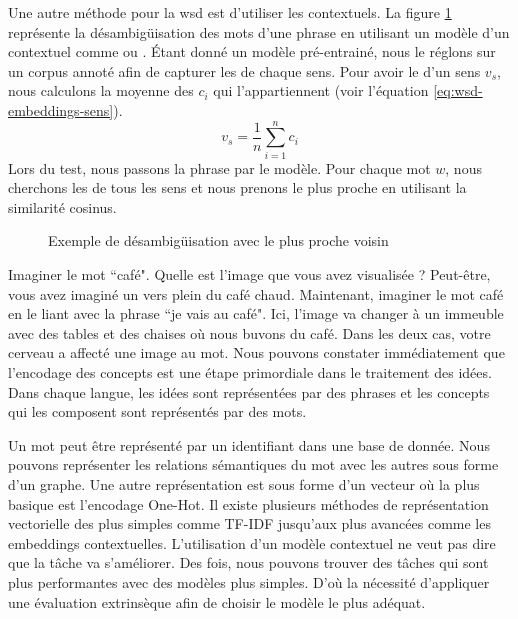\documentclass{KodeBook}
\begin{document}
Une autre méthode pour la \ac{wsd}  est d'utiliser les  contextuels. 
La figure \ref{fig:swd-embeddings} représente la désambigüisation des mots d'une phrase en utilisant un modèle d'un  contextuel comme  ou . 
Étant donné un modèle pré-entrainé, nous le réglons sur un corpus annoté afin de capturer les  de chaque sens. 
Pour avoir le  d'un sens $v_s$, nous calculons la moyenne des  $c_i$ qui l'appartiennent (voir l'équation \ref{eq:wsd-embeddings-sens}).
\begin{equation}
v_s = \frac{1}{n} \sum_{i=1}^{n} c_i 
\label{eq:wsd-embeddings-sens}
\end{equation}
Lors du test, nous passons la phrase par le modèle. 
Pour chaque mot $w$, nous cherchons les  de tous les sens et nous prenons le plus proche en utilisant la similarité cosinus.

\begin{figure}[ht]
	\centering
	\caption[Exemple de désambigüisation avec le plus proche voisin]{Exemple de désambigüisation avec le plus proche voisin \cite{2019-jurafsky-martin}}
	\label{fig:swd-embeddings}
\end{figure}


Imaginer le mot ``café". 
Quelle est l'image que vous avez visualisée ?
Peut-être, vous avez imaginé un vers plein du café chaud.
Maintenant, imaginer le mot café en le liant avec la phrase ``je vais au café". 
Ici, l'image va changer à un immeuble  avec des tables et des chaises où nous buvons du café. 
Dans les deux cas, votre cerveau a affecté une image au mot.
Nous pouvons constater immédiatement que l'encodage des concepts est une étape primordiale dans le traitement des idées. 
Dans chaque langue, les idées sont représentées par des phrases et les concepts qui les composent sont représentés par des mots.

Un mot peut être représenté par un identifiant dans une base de donnée.
Nous pouvons représenter les relations sémantiques du mot avec les autres sous forme d'un graphe.
Une autre représentation est sous forme d'un vecteur où la plus basique est l'encodage One-Hot. 
Il existe plusieurs méthodes de représentation vectorielle des plus simples comme TF-IDF jusqu'aux plus avancées comme les embeddings contextuelles. 
L'utilisation d'un modèle contextuel ne veut pas dire que la tâche va s'améliorer. 
Des fois, nous pouvons trouver des tâches qui sont plus performantes avec des modèles plus simples.
D'où la nécessité d'appliquer une évaluation extrinsèque afin de choisir le modèle le plus adéquat.
\end{document}
